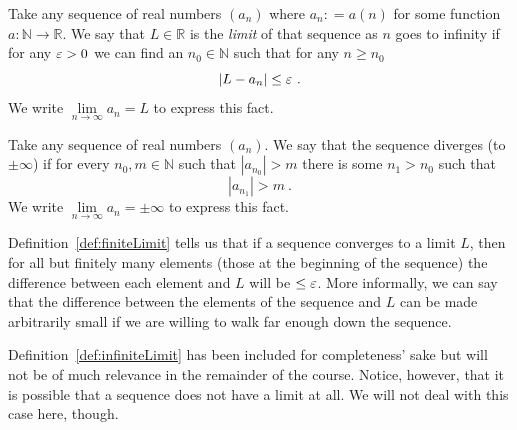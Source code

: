 \begin{Definition}\label{def:finiteLimit}
Take any sequence of real numbers $ \left( a_{n} \right) $ where $ a_{n} : = a(n) $ for some function $ a : \mathbb{N} \rightarrow \mathbb{R} $.
We say that $ L \in \mathbb{R} $ is the \emph{limit} of that sequence as $ n $ goes to infinity if for any $ \varepsilon > 0 $ we can find an 
$ n_{0} \in \mathbb{N} $ such that for any $ n \geq n_{0} $
$$ |L - a_{n}| \leq \varepsilon\ . $$
We write $ \underset{n \rightarrow \infty}{\lim} a_{n} = L $ to express this fact.
\end{Definition}

\begin{Definition}\label{def:infiniteLimit}
Take any sequence of real numbers $ \left( a_{n} \right) $. We say that the sequence diverges (to $ \pm \infty $) if for every $ n_{0},m \in \mathbb{N} $
such that $ |a_{n_{0}}| > m $ there is some $ n_{1} > n_{0} $ such that 
$$ |a_{n_{1}}| > m \ . $$
We write $ \underset{n \rightarrow \infty}{\lim} a_{n} = \pm \infty $ to express this fact.
\end{Definition}


Definition~\ref{def:finiteLimit} tells us that if a sequence converges to a limit $ L $, then for all but finitely many elements (those at the beginning of the sequence)
the difference between each element and $ L $ will be $ \leq \varepsilon $. More informally, we can say that the difference between the elements of the sequence and $ L $
can be made arbitrarily small if we are willing to walk far enough down the sequence. 

Definition~\ref{def:infiniteLimit} has been included for completeness' sake but will not be of much relevance in the remainder of the course. Notice, however, that
it is possible that a sequence does not have a limit at all.  We will not deal with this case here, though. 

